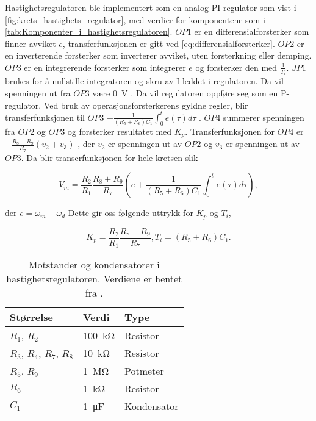 Hastighetsregulatoren ble implementert som en analog PI-regulator som vist i \autoref{fig:krets_hastighets_regulator}, med verdier for komponentene som i \autoref{tab:Komponenter_i_hastighetsregulatoren}. $OP1$ er en differensialforsterker som finner avviket $e$, transferfunksjonen er gitt ved \eqref{eq:differensialforsterker}.
$OP2$ er en inverterende forsterker som inverterer avviket, uten forsterkning eller demping.
$OP3$ er en integrerende forsterker som integrerer $e$ og forsterker den med $\frac{1}{T_i}$.
$JP1$ brukes for å nullstille integratoren og skru av I-leddet i regulatoren.
Da vil spenningen ut fra $OP3$ være \SI{0}{\volt} \cite{AnalogMotorlabbOppgaver}.
Da vil regulatoren oppføre seg som en P-regulator.
Ved bruk av operasjonsforsterkerens gyldne regler, blir transferfunksjonen til $OP3$ $-\frac{1}{(R_5 + R_6) C_1} \int^t_0 e(\tau) d\tau$ \cite{Johnson}.
$OP4$ summerer spenningen fra $OP2$ og $OP3$ og forsterker resultatet med $K_p$.
Transferfunksjonen for $OP4$ er $-\frac{R_8 + R_9}{R_7}(v_2 + v_3)$ \cite{Johnson}, der $v_2$ er spenningen ut av $OP2$ og $v_3$ er spenningen ut av $OP3$. 
Da blir transerfunksjonen for hele kretsen slik

\begin{equation}
    \label{eq:hastighet_regulator_transferfuksjon}
    V_m =
    \frac{R_2}{R_1} \frac{R_8 + R_9}{R_7} \left(e + \frac{1}{(R_5 + R_6) C_1} \int^t_0 e(\tau) d\tau \right),
\end{equation}

der $e = \omega_m - \omega_d$
Dette gir oss følgende uttrykk for $K_p$ og $T_i$,

\begin{equation}
    \label{eq:K_p_og_T_i}
    K_p = \frac{R_2}{R_1} \frac{R_8 + R_9}{R_7}, 
    T_i = (R_5 + R_6) C_1.
\end{equation}

\begin{table}[h]
    \centering
    \caption{Motstander og kondensatorer i hastighetsregulatoren. Verdiene er hentet fra \cite{AnalogMotorlabbOppgaver}.}
    \begin{tabular}{lll}
        \toprule
        Størrelse & Verdi & Type \\
		\midrule
        $R_1$, $R_2$ & \SI{100}{\kilo\ohm} & Resistor\\
        $R_3$, $R_4$, $R_7$, $R_8$ & \SI{10}{\kilo\ohm} & Resistor \\
        $R_5$, $R_9$ & \SI{1}{\mega\ohm} & Potmeter \\
        $R_6$ & \SI{1}{\kilo\ohm} & Resistor \\
        $C_1$ & \SI{1}{\micro\farad} & Kondensator \\
        \bottomrule
    \end{tabular}
    \label{tab:Komponenter_i_hastighetsregulatoren}
\end{table}






